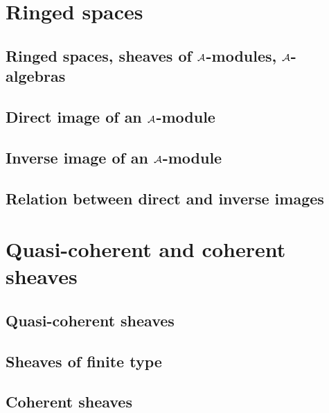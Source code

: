 \documentclass[10pt,oneside]{amsart}
\begin{document}
    \section{Ringed spaces}

        \subsection{Ringed spaces, sheaves of $\mathcal{A}$-modules, $\mathcal{A}$-algebras}
        

        \subsection{Direct image of an $\mathcal{A}$-module}
        

        \subsection{Inverse image of an $\mathcal{A}$-module}
        

        \subsection{Relation between direct and inverse images}
        

    \section{Quasi-coherent and coherent sheaves}

        \subsection{Quasi-coherent sheaves}
        

        \subsection{Sheaves of finite type}
        

        \subsection{Coherent sheaves}
        
\end{document}
